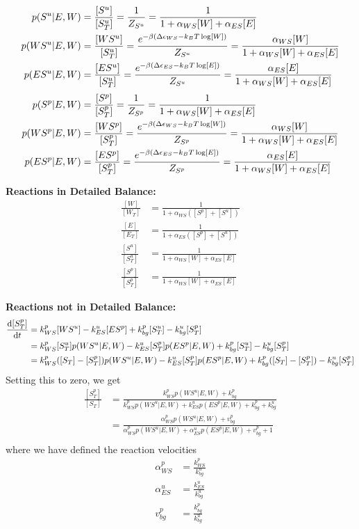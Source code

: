 \documentclass[aps,onecolumn,superscriptaddress,notitlepage]{revtex4-1}
\begin{document}
\begin{align}
p(S^u|E, W) &= \frac{[S^u]}{[S^u_T]} = \frac{1}{Z_{S^u}} = \frac{1}{1 + \alpha_{WS}[W]+ \alpha_{ES}[E]}\\
p(WS^u|E, W) &= \frac{[WS^u]}{[S^u_T]} = \frac{ e^{-\beta\qty(\Delta\epsilon_{WS} -k_BT \log[W])}}{Z_{S^u}} = \frac{\alpha_{WS}[W]}{1 + \alpha_{WS}[W]+ \alpha_{ES}[E]}\\
p(ES^u|E, W) &= \frac{[ES^u]}{[S^u_T]} = \frac{ e^{-\beta\qty(\Delta\epsilon_{ES} -k_BT \log[E])}}{Z_{S^u}} = \frac{\alpha_{ES}[E]}{1 + \alpha_{WS}[W]+ \alpha_{ES}[E]}
\end{align}
\begin{align}
p(S^p|E, W) &= \frac{[S^p]}{[S^p_T]} = \frac{1}{Z_{S^p}} = \frac{1}{1 + \alpha_{WS}[W]+ \alpha_{ES}[E]}\\
p(WS^p|E, W) &= \frac{[WS^p]}{[S^p_T]} = \frac{ e^{-\beta\qty(\Delta\epsilon_{WS} -k_BT \log[W])}}{Z_{S^p}} = \frac{\alpha_{WS}[W]}{1 + \alpha_{WS}[W]+ \alpha_{ES}[E]}\\
p(ES^p|E, W) &= \frac{[ES^p]}{[S^p_T]} = \frac{ e^{-\beta\qty(\Delta\epsilon_{ES} -k_BT \log[E])}}{Z_{S^p}} = \frac{\alpha_{ES}[E]}{1 + \alpha_{WS}[W]+ \alpha_{ES}[E]}
\end{align}

\textbf{Reactions in Detailed Balance:}
\begin{align}
\frac{[W]}{[W_T]} & = \frac{1}{1 + \alpha_{WS}([S^p]+[S^u])}\\
\frac{[E]}{[E_T]} & = \frac{1}{1 + \alpha_{ES}([S^p]+[S^u])}\\
\frac{[S^u]}{[S^u_T]} &= \frac{1}{1 + \alpha_{WS}[W]+ \alpha_{ES}[E]}\\
\frac{[S^p]}{[S^p_T]} &=  \frac{1}{1+ \alpha_{WS}[W] + \alpha_{ES}[E]}
\end{align}

\textbf{Reactions not in  Detailed Balance:}
\begin{align}
\dv{[S^p_T]}{t} &= k_{WS}^p[WS^u] - k_{ES}^u[ES^p] + k_{bg}^p[S^u_T] - k_{bg}^u[S^p_T] \\
&= k_{WS}^p[S^u_T]p(WS^u|E, W) - k_{ES}^u[S^p_T]p(ES^p|E, W) + k_{bg}^p[S^u_T] - k_{bg}^u[S^p_T]\\
&= k_{WS}^p([S_T]-[S^p_T])p(WS^u|E, W) - k_{ES}^u[S^p_T]p(ES^p|E, W) + k_{bg}^p([S_T]-[S^p_T]) - k_{bg}^u[S^p_T]
\end{align}
Setting this to zero, we get
\begin{align}
\frac{[S_T^p]}{[S_T]} &= \frac{k_{WS}^p p(WS^u|E,W) + k_{bg}^p}{k_{WS}^p p(WS^u|E,W) + k_{ES}^u p(ES^p|E,W) + k_{bg}^p + k_{bg}^u}\\
 &= \frac{\alpha_{WS}^p p(WS^u|E,W) + v_{bg}^p}{\alpha_{WS}^p p(WS^u|E,W) + \alpha_{ES}^u p(ES^p|E,W) + v_{bg}^p + 1}\\
\end{align}
where we have defined the reaction velocities
\begin{align}
\alpha_{WS}^p &= \frac{k_{WS}^p}{k_{bg}^u}\\
\alpha_{ES}^u &= \frac{k_{ES}^u}{k_{bg}^u}\\
v_{bg}^p &= \frac{k_{bg}^p}{k_{bg}^u}
\end{align}
\end{document}
